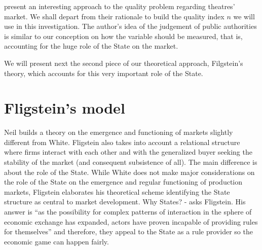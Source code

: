 \documentclass[a4paper, 12pt, openright, oneside, german, french, brazil, english, article]{abntex2}
\begin{document}
	 present an interesting approach to the quality problem regarding theatres' market. We shall depart from their rationale to build the quality index $n$ we will use in this investigation. The author's idea of the judgement of public authorities is similar to our conception on how the variable should be measured, that is, accounting for the huge role of the State on the market.
	
		
	
		
	We will present next the second piece of our theoretical approach, Filgstein's theory, which accounts for this very important role of the State.
	
	\section{Fligstein's model}
	
	
	
	Neil  builds a theory on the emergence and functioning of markets slightly different from White. Fligstein also takes into account a relational structure where firms interact with each other and with the generalized buyer seeking the stability of the market (and consequent subsistence of all). The main difference is about the role of the State. While White does not make major considerations on the role of the State on the emergence and regular functioning of production markets, Fligstein elaborates his theoretical scheme identifying the State structure as central to market development. Why States? - asks Fligstein. His answer is ``as the possibility for complex patterns of interaction in the sphere of economic exchange has expanded, actors have proven incapable of providing rules for themselves'' \cite[p. 27-8]{fligstein2002architecture} and therefore, they appeal to the State as a rule provider so the economic game can happen fairly.
\end{document}
